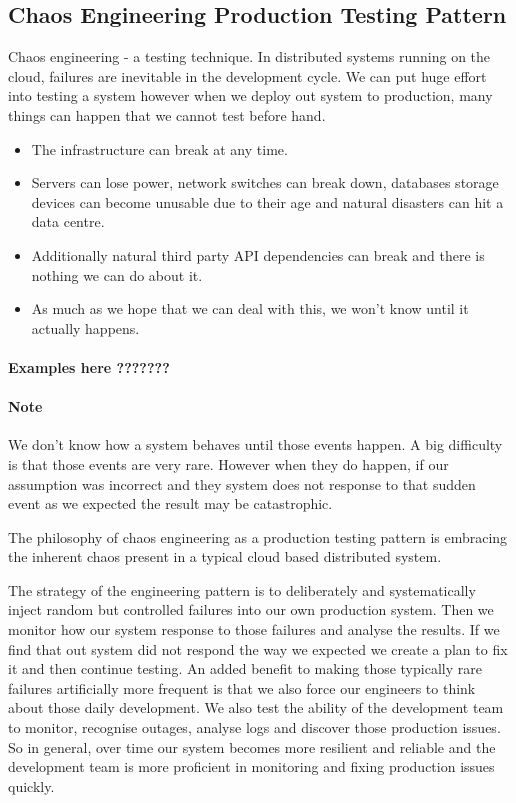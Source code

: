 \subsection{Chaos Engineering Production Testing Pattern}
Chaos engineering - a testing technique.
In distributed systems running on the cloud, failures are inevitable in the development cycle.
We can put huge effort into testing a system however when we deploy out system to production, many things can happen that we cannot test before hand.
\begin{itemize}
    \item The infrastructure can break at any time.
    \item Servers can lose power, network switches can break down, databases storage devices can become unusable due to their age and natural disasters can hit a data centre.
    \item Additionally natural third party API dependencies can break and there is nothing we can do about it.
    \item As much as we hope that we can deal with this, we won't know until it actually happens.
\end{itemize}

\paragraph{Examples here ???????}

\paragraph{Note}
We don't know how a system behaves until those events happen.
A big difficulty is that those events are very rare.
However when they do happen, if our assumption was incorrect and they system does not response to that sudden event as we expected the result may be catastrophic.

The philosophy of chaos engineering as a production testing pattern is embracing the inherent chaos present in a typical cloud based distributed system.

The strategy of the engineering pattern is to deliberately and systematically inject random but controlled failures into our own production system.
Then we monitor how our system response to those failures and analyse the results.
If we find that out system did not respond the way we expected we create a plan to fix it and then continue testing.
An added benefit to making those typically rare failures artificially more frequent is that we also force our engineers to think about those daily development.
We also test the ability of the development team to monitor, recognise outages, analyse logs and discover those production issues.
So in general, over time our system becomes more resilient and reliable and the development team is more proficient in monitoring and fixing production issues quickly.


